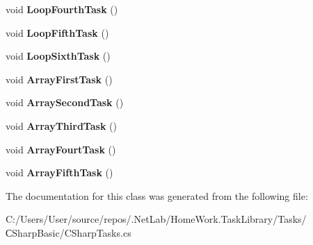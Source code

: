 \begin{DoxyCompactItemize}
void {\bfseries Loop\+Fourth\+Task} ()
\item 
\mbox{\label{class_home_work_1_1_task_library_1_1_tasks_1_1_xD0_xA1_sharp_basic_1_1_c_sharp_tasks_a94e890b6678e6045712fbb5139a049fd}} 
void {\bfseries Loop\+Fifth\+Task} ()
\item 
\mbox{\label{class_home_work_1_1_task_library_1_1_tasks_1_1_xD0_xA1_sharp_basic_1_1_c_sharp_tasks_acb5aebd602fcbd231214d06df998c144}} 
void {\bfseries Loop\+Sixth\+Task} ()
\item 
\mbox{\label{class_home_work_1_1_task_library_1_1_tasks_1_1_xD0_xA1_sharp_basic_1_1_c_sharp_tasks_a623437e66160e4482afb3e64123ad82d}} 
void {\bfseries Array\+First\+Task} ()
\item 
\mbox{\label{class_home_work_1_1_task_library_1_1_tasks_1_1_xD0_xA1_sharp_basic_1_1_c_sharp_tasks_a628cd80174d340a6f4f7e1c8fde37cca}} 
void {\bfseries Array\+Second\+Task} ()
\item 
\mbox{\label{class_home_work_1_1_task_library_1_1_tasks_1_1_xD0_xA1_sharp_basic_1_1_c_sharp_tasks_a9eb0fd029748466572ec4bf80c1a7643}} 
void {\bfseries Array\+Third\+Task} ()
\item 
\mbox{\label{class_home_work_1_1_task_library_1_1_tasks_1_1_xD0_xA1_sharp_basic_1_1_c_sharp_tasks_ac569706c2a7837e4234a05709e11f646}} 
void {\bfseries Array\+Fourt\+Task} ()
\item 
\mbox{\label{class_home_work_1_1_task_library_1_1_tasks_1_1_xD0_xA1_sharp_basic_1_1_c_sharp_tasks_aa0581fb3183adf14449f0dfef06692a5}} 
void {\bfseries Array\+Fifth\+Task} ()
\end{DoxyCompactItemize}


The documentation for this class was generated from the following file\+:\begin{DoxyCompactItemize}
\item 
C\+:/\+Users/\+User/source/repos/.\+Net\+Lab/\+Home\+Work.\+Task\+Library/\+Tasks/С\+Sharp\+Basic/C\+Sharp\+Tasks.\+cs\end{DoxyCompactItemize}
